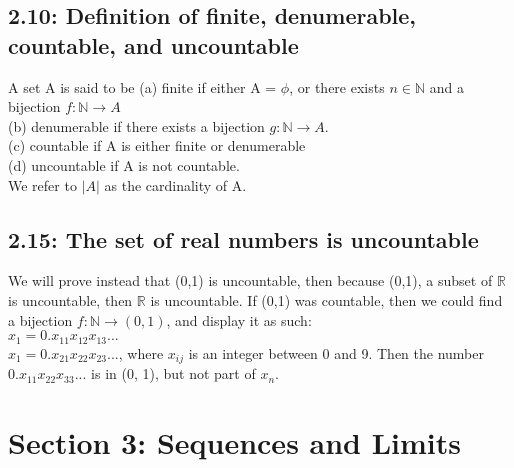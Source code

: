 \documentclass[10pt,letter]{report}
\begin{document}
\section*{2.10: Definition of finite, denumerable, countable, and uncountable}
A set A is said to be
(a) finite if either A = $\phi$, or there exists $n \in \mathbb{N}$ and a bijection $f: \mathbb{N} \rightarrow A$ \\
(b) denumerable if there exists a bijection $g: \mathbb{N} \rightarrow A$.\\ 
(c) countable if A is either finite or denumerable \\ 
(d) uncountable if A is not countable. \\ 
We refer to $|A|$ as the cardinality of A. 

\section*{2.15: The set of real numbers is uncountable}
We will prove instead that (0,1) is uncountable, then because (0,1), a subset of $\mathbb{R}$ is uncountable, then $\mathbb{R}$ is uncountable. If (0,1) was countable, then we could find a bijection $f: \mathbb{N} \rightarrow (0,1)$, and display it as such:\\ 
$x_1 = 0.x_{11}x_{12}x_{13} ...$\\ 
$x_1 = 0.x_{21}x_{22}x_{23} ...$, where $x_{ij}$ is an integer between 0 and 9. Then the number $0.x_{11}x_{22}x_{33}...$ is in (0, 1), but not part of $x_n$.



\chapter*{Section 3: Sequences and Limits}
\end{document}
